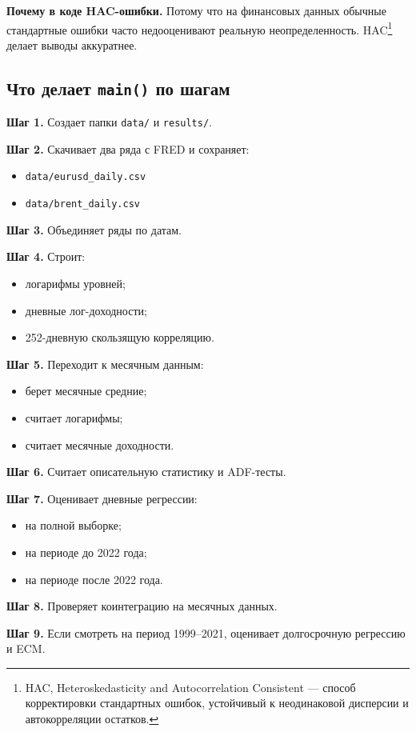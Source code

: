 \documentclass[a4paper,12pt]{article}
\begin{document}
\textbf{Почему в коде HAC-ошибки.}
Потому что на финансовых данных обычные стандартные ошибки часто недооценивают реальную неопределенность. HAC\footnote{HAC, Heteroskedasticity and Autocorrelation Consistent --- способ корректировки стандартных ошибок, устойчивый к неодинаковой дисперсии и автокорреляции остатков.} делает выводы аккуратнее.

\subsection{Что делает \texttt{main()} по шагам}
\textbf{Шаг 1.} Создает папки \texttt{data/} и \texttt{results/}.

\textbf{Шаг 2.} Скачивает два ряда с FRED и сохраняет:
\begin{itemize}
    \item \texttt{data/eurusd\_daily.csv}
    \item \texttt{data/brent\_daily.csv}
\end{itemize}

\textbf{Шаг 3.} Объединяет ряды по датам.

\textbf{Шаг 4.} Строит:
\begin{itemize}
    \item логарифмы уровней;
    \item дневные лог-доходности;
    \item 252-дневную скользящую корреляцию.
\end{itemize}

\textbf{Шаг 5.} Переходит к месячным данным:
\begin{itemize}
    \item берет месячные средние;
    \item считает логарифмы;
    \item считает месячные доходности.
\end{itemize}

\textbf{Шаг 6.} Считает описательную статистику и ADF-тесты.

\textbf{Шаг 7.} Оценивает дневные регрессии:
\begin{itemize}
    \item на полной выборке;
    \item на периоде до 2022 года;
    \item на периоде после 2022 года.
\end{itemize}

\textbf{Шаг 8.} Проверяет коинтеграцию на месячных данных.

\textbf{Шаг 9.} Если смотреть на период 1999--2021, оценивает долгосрочную регрессию и ECM.
\end{document}
